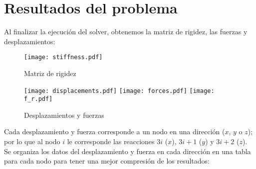 \documentclass[12pt,a3paper]{article}
\begin{document}
\section{Resultados del problema}
Al finalizar la ejecución del solver, obtenemos la matriz de rigidez, las fuerzas y desplazamientos:
\begin{figure}[H]
    \centering
    \texttt{[image: stiffness.pdf]}
    \caption{Matriz de rigidez}
\end{figure}
\begin{figure}[H]
    \centering
    \texttt{[image: displacements.pdf]}
    \texttt{[image: forces.pdf]}
    \texttt{[image: f\_r.pdf]}
    \caption{Desplazamientos y fuerzas}
\end{figure}
Cada desplazamiento y fuerza corresponde a un nodo en una dirección ($x$, $y$ o $z$); por lo que al nodo $i$ le corresponde las reacciones $3i$ ($x$), $3i+1$ ($y$) y $3i+2$ ($z$).\\
Se organiza los datos del desplazamiento y fuerza en cada dirección en una tabla para cada nodo para tener una mejor compresión de los resultados:
\end{document}
